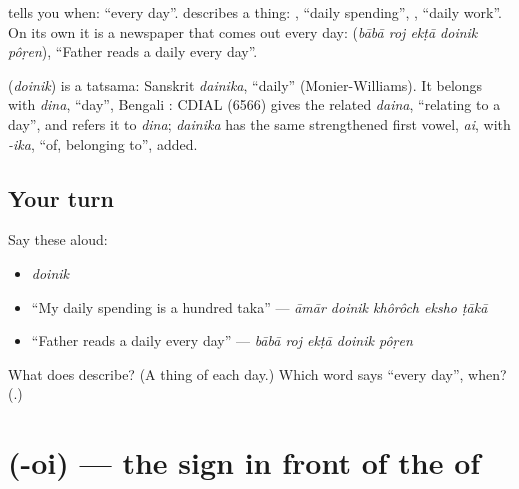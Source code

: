 \textbf{} tells you when: \textquotedblleft{}every day\textquotedblright{}. \textbf{} describes a thing: \textbf{ }, \textquotedblleft{}daily spending\textquotedblright{}, \textbf{ }, \textquotedblleft{}daily work\textquotedblright{}. On its own it is a newspaper that comes out every day: \textbf{    } (\emph{bābā roj ekṭā doinik pôṛen}), \textquotedblleft{}Father reads a daily every day\textquotedblright{}.

\begin{cousinweb}
\textbf{} (\emph{doinik}) is a tatsama: Sanskrit \emph{dainika}, \textquotedblleft{}daily\textquotedblright{} (Monier-Williams). It belongs with \emph{dina}, \textquotedblleft{}day\textquotedblright{}, Bengali \textbf{}: CDIAL (6566) gives the related \emph{daina}, \textquotedblleft{}relating to a day\textquotedblright{}, and refers it to \emph{dina}; \emph{dainika} has the same strengthened first vowel, \emph{ai}, with \emph{-ika}, \textquotedblleft{}of, belonging to\textquotedblright{}, added.
\end{cousinweb}

\subsection*{Your turn}
Say these aloud:

\begin{itemize}
\raggedright
  \item \emph{doinik}
  \item \textquotedblleft{}My daily spending is a hundred taka\textquotedblright{} — \emph{āmār doinik khôrôch eksho ṭākā}
  \item \textquotedblleft{}Father reads a daily every day\textquotedblright{} — \emph{bābā roj ekṭā doinik pôṛen}
\end{itemize}

\begin{tcolorbox}[breakable,colback=teal!4,colframe=teal!35!black,title={Before you move on}]
What does \textbf{} describe? (A thing of each day.) Which word says \textquotedblleft{}every day\textquotedblright{}, when? (\textbf{}.)
\end{tcolorbox}
\section[\texorpdfstring{\bn{ৈ} (-oi)}{ৈ (-oi)}]{ (-oi) — the sign in front of the  of }

